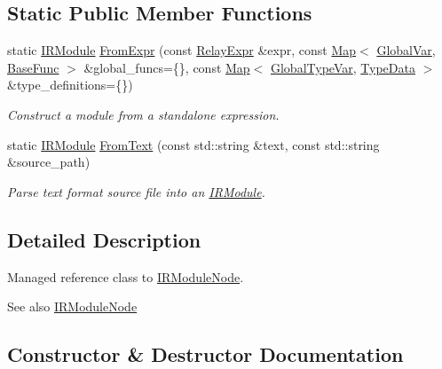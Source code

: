 \subsection*{Static Public Member Functions}
\begin{DoxyCompactItemize}
\item 
static \hyperlink{classtvm_1_1IRModule}{I\+R\+Module} \hyperlink{classtvm_1_1IRModule_a59099426f65dbeac227e51f8864e322a}{From\+Expr} (const \hyperlink{classtvm_1_1RelayExpr}{Relay\+Expr} \&expr, const \hyperlink{classtvm_1_1Map}{Map}$<$ \hyperlink{classtvm_1_1GlobalVar}{Global\+Var}, \hyperlink{classtvm_1_1BaseFunc}{Base\+Func} $>$ \&global\+\_\+funcs=\{\}, const \hyperlink{classtvm_1_1Map}{Map}$<$ \hyperlink{classtvm_1_1GlobalTypeVar}{Global\+Type\+Var}, \hyperlink{classtvm_1_1TypeData}{Type\+Data} $>$ \&type\+\_\+definitions=\{\})
\begin{DoxyCompactList}\small\item\em Construct a module from a standalone expression. \end{DoxyCompactList}\item 
static \hyperlink{classtvm_1_1IRModule}{I\+R\+Module} \hyperlink{classtvm_1_1IRModule_a499a18238ecdccf2738d7edb05408eee}{From\+Text} (const std\+::string \&text, const std\+::string \&source\+\_\+path)
\begin{DoxyCompactList}\small\item\em Parse text format source file into an \hyperlink{classtvm_1_1IRModule}{I\+R\+Module}. \end{DoxyCompactList}\end{DoxyCompactItemize}


\subsection{Detailed Description}
Managed reference class to \hyperlink{classtvm_1_1IRModuleNode}{I\+R\+Module\+Node}. 

\begin{DoxySeeAlso}{See also}
\hyperlink{classtvm_1_1IRModuleNode}{I\+R\+Module\+Node} 
\end{DoxySeeAlso}


\subsection{Constructor \& Destructor Documentation}
